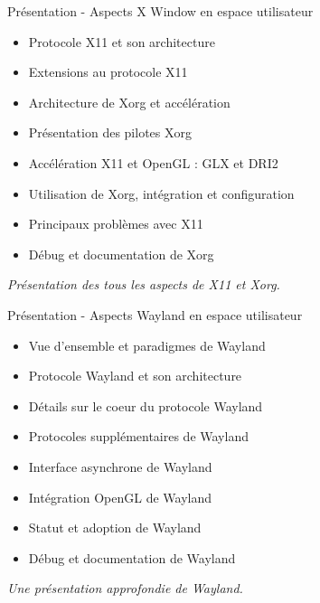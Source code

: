 \documentclass[a4paper,12pt,obeyspaces,spaces,hyphens]{article}
\begin{document}
\feagendatwocolumn
{Présentation - Aspects X Window en espace utilisateur}
{
  \begin{itemize}
  \item Protocole X11 et son architecture
  \item Extensions au protocole X11
  \item Architecture de Xorg et accélération
  \item Présentation des pilotes Xorg
  \item Accélération X11 et OpenGL : GLX et DRI2
  \item Utilisation de Xorg, intégration et configuration
  \item Principaux problèmes avec X11
  \item Débug et documentation de Xorg
  \end{itemize}
  \vspace{0.5em}
  {\em Présentation des tous les aspects de X11 et Xorg.}
}
{Présentation - Aspects Wayland en espace utilisateur}
{
  \begin{itemize}
  \item Vue d'ensemble et paradigmes de Wayland
  \item Protocole Wayland et son architecture
  \item Détails sur le coeur du protocole Wayland
  \item Protocoles supplémentaires de Wayland
  \item Interface asynchrone de Wayland
  \item Intégration OpenGL de Wayland
  \item Statut et adoption de Wayland
  \item Débug et documentation de Wayland
  \end{itemize}
  \vspace{0.5em}
  {\em Une présentation approfondie de Wayland.}
}\\
\end{document}
